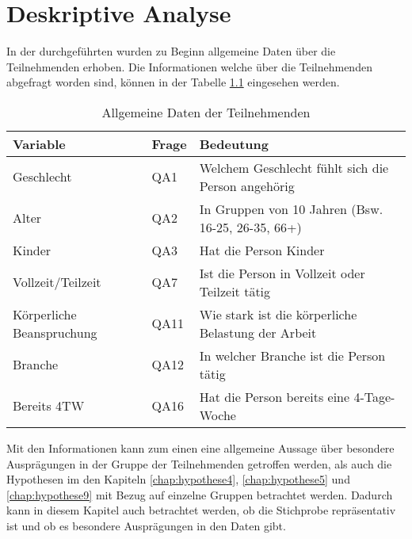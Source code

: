 \chapter{Deskriptive Analyse}

In der durchgeführten wurden zu Beginn allgemeine Daten über die Teilnehmenden erhoben.
Die Informationen welche über die Teilnehmenden abgefragt worden sind, können in der Tabelle
\ref{tab:allgemeine_daten} eingesehen werden.

\begin{table}[h]
    \centering
    \begin{tabular}{|l|l|p{8cm}|}
        \hline
        \textbf{Variable} & \textbf{Frage} & \textbf{Bedeutung}\\
        \hline
        Geschlecht & QA1 & Welchem Geschlecht fühlt sich die Person angehörig\\
        Alter & QA2 & In Gruppen von 10 Jahren (Bsw. 16-25, 26-35, 66+)\\
        Kinder & QA3 & Hat die Person Kinder\\
        Vollzeit/Teilzeit & QA7 & Ist die Person in Vollzeit oder Teilzeit tätig\\
        Körperliche Beanspruchung & QA11 & Wie stark ist die körperliche Belastung der Arbeit\\
        Branche & QA12 & In welcher Branche ist die Person tätig\\
        Bereits 4TW & QA16 & Hat die Person bereits eine 4-Tage-Woche\\
        \hline
    \end{tabular}
    \caption{Allgemeine Daten der Teilnehmenden}
    \label{tab:allgemeine_daten}
\end{table}

Mit den Informationen kann zum einen eine allgemeine Aussage über besondere Ausprägungen in der
Gruppe der Teilnehmenden 
getroffen werden, als auch die Hypothesen im den Kapiteln \ref{chap:hypothese4},
\ref{chap:hypothese5} und \ref{chap:hypothese9} mit Bezug auf einzelne Gruppen betrachtet werden. 
Dadurch kann in diesem Kapitel auch betrachtet werden, ob die Stichprobe repräsentativ ist 
und ob es besondere Ausprägungen in den Daten gibt.
 